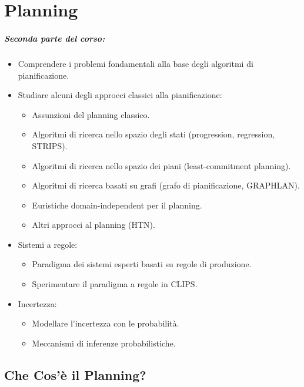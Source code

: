 \chapter{Planning}

\paragraph{Seconda parte del corso:}

\begin{itemize}
  \item Comprendere i problemi fondamentali alla base degli algoritmi di pianificazione. 
  \item Studiare alcuni degli approcci classici alla pianificazione:
    \begin{itemize}
      \item Assunzioni del planning classico. 
      \item Algoritmi di ricerca nello spazio degli stati (progression, regression, STRIPS). 
      \item Algoritmi di ricerca nello spazio dei piani (least-commitment planning). 
      \item Algoritmi di ricerca basati su grafi (grafo di pianificazione, GRAPHLAN). 
      \item Euristiche domain-independent per il planning. 
      \item Altri approcci al planning (HTN).
    \end{itemize}
  \item Sistemi a regole:
    \begin{itemize}
      \item Paradigma dei sistemi esperti basati su regole di produzione. 
      \item Sperimentare il paradigma a regole in CLIPS.
    \end{itemize}
  \item Incertezza: 
    \begin{itemize}
      \item Modellare l'incertezza con le probabilità. 
      \item Meccanismi di inferenze probabilistiche.
    \end{itemize}
\end{itemize}

\section{Che Cos'è il Planning?}

